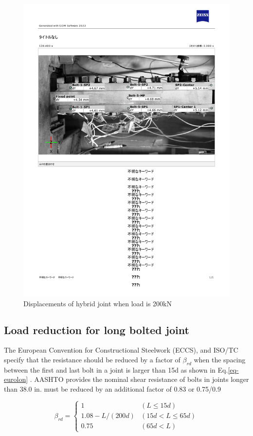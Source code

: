 \begin{figure}
    \centering
    \includegraphics[width=0.85\linewidth]{imgs/ch6/dic-B3-200kN.pdf}
    \caption{Displacements of hybrid joint when load is 200kN }
    \label{fig-dicdisp}
\end{figure}

\subsection{Load reduction for long bolted joint}

The European Convention for Constructional Steelwork (ECCS), and ISO/TC specify that the resistance should be reduced by a factor of $\beta_{rd}$ when the spacing between the first and last bolt in a joint is larger than 15d as shown in Eq.\ref{eq-eurolon} \cite{eccs1985,isohtb}. AASHTO \cite{AASHTO2020} provides the nominal shear resistance of bolts in joints longer than 38.0 in. must be reduced by an additional factor of 0.83 or 0.75/0.9\par

\begin{equation}\label{eq-eurolon}
    \beta_{rd} = 
    \begin{cases}
    1 & (L \leq 15 d) \\ 
    1.08-L / (200 d) & (15 d < L \leq 65 d)\\ 
    0.75 & (65 d < L)
    \end{cases}
\end{equation}

